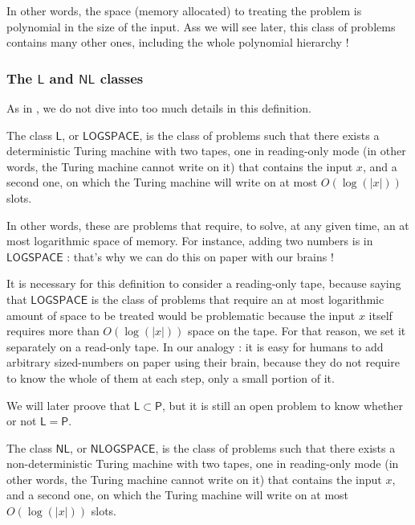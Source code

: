 In other words, the space (memory allocated) to treating the problem is polynomial in the size of the input. Ass we will see later, this class of problems contains many other ones, including the whole polynomial hierarchy !

\subsubsection{The $ \mathsf L $ and $ \mathsf{NL} $ classes}

As in \cite{gowers2024}, we do not dive into too much details in this definition.

\begin{definition}[$ \mathsf L $]
    The class $ \mathsf{L} $, or $ \mathsf{LOGSPACE} $, is the class of problems such that there exists a deterministic Turing machine with two tapes, one in \og reading-only \fg mode (in other words, the Turing machine cannot write on it) that contains the input $ x $, and a second one, on which the Turing machine will write on at most $ O(\log(|x|)) $ slots.
\end{definition}

In other words, these are problems that require, to solve, at any given time, an at most logarithmic space of memory. For instance, adding two numbers is in $ \mathsf{LOGSPACE} $ : that's why we can do this on paper with our brains !

It is necessary for this definition to consider a reading-only tape, because saying that \og $ \mathsf{LOGSPACE} $ is the class of problems that require an at most logarithmic amount of space to be treated \fg would be problematic because the input $ x $ itself requires more than $ O(\log(|x|)) $ space on the tape. For that reason, we set it separately on a read-only tape. In our analogy : it is easy for humans to add arbitrary sized-numbers on paper using their brain, because they do not require to know the whole of them at each step, only a small portion of it.

We will later proove that $ \mathsf L \subset \mathsf P $, but it is still an open problem to know whether or not $ \mathsf L = \mathsf P $.

\begin{definition}[$ \mathsf NL $]
    The class $ \mathsf{NL} $, or $ \mathsf{NLOGSPACE} $, is the class of problems such that there exists a non-deterministic Turing machine with two tapes, one in \og reading-only \fg mode (in other words, the Turing machine cannot write on it) that contains the input $ x $, and a second one, on which the Turing machine will write on at most $ O(\log(|x|)) $ slots.
\end{definition}

